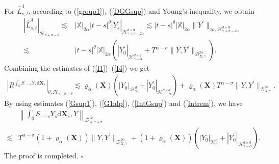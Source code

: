 \documentclass[10pt,a4paper]{article}
\numberwithin{equation}{section}
\begin{document}
For $\hat{L}_{s,t}^4$, according to (\ref{group1}), (\ref{DGGsup}) and Young's inequality, we obtain
\begin{align}\label{I4}
	|\hat{L}_{s,t}^4|_{\mathcal H_{\gamma+\sigma-\theta}} \lesssim & |\mathbb{X}|_{2\alpha} |t-s|^\theta |Y_s^\prime|_{\mathcal H_{\gamma+\sigma-2\alpha}^{d \times d}}
	\lesssim |t-s|^\theta |\mathbb{X}|_{2\alpha} \|Y^\prime \|_{\infty,\mathcal H_{\gamma+\sigma-2\alpha}^{d \times d}} \nonumber\\
	\lesssim & |t-s|^\theta |\mathbb{X}|_{2\alpha} \left(|Y_0^\prime|_{\mathcal H_{\gamma-\alpha}^{d \times d}}+T^{\alpha-\sigma}\|Y,Y^\prime\|_{\mathcal{D}_{X,\gamma}^{2\alpha}} \right).
\end{align}
Combining the estimates of (\ref{I1})--(\ref{I4}) we get
\begin{align}\label{Intrem}
	\left|R^{\int_0^\cdot S_{\cdot-s} Y_s \mathrm{d} \mathbf X_s} \right|_{\theta,\mathcal H_{\gamma+\sigma-\theta}}
	\lesssim \varrho_{\alpha}(\mathbf{X}) \left(|Y_0|_{\mathcal H_\gamma^d}+|Y_0^\prime|_{\mathcal H_{\gamma-\alpha}^{d \times d}} \right)
	+ \varrho_{\alpha}(\mathbf{X}) T^{\alpha-\sigma} \|Y,Y^\prime\|_{\mathcal{D}_{X,\gamma}^{2\alpha}}.
\end{align}
By using estimates (\ref{Gsup1}), (\ref{G1alp}), (\ref{IntGsup}) and (\ref{Intrem}),
we have
\begin{align}\label{BInt}
	&\left\|\int_0^\cdot S_{\cdot-s} Y_s \mathrm{d} \mathbf X_s, Y \right\|_{\mathcal{D}_{X,\gamma+\sigma}^{2\alpha}} \nonumber\\
	\lesssim & T^{\alpha-\sigma} \left(1+\varrho_{\alpha}(\mathbf{X}) \right) \|Y,Y^\prime\|_{\mathcal{D}_{X,\gamma}^{2\alpha}} +(1+\varrho_{\alpha}(\mathbf{X})) \left(|Y_0|_{\mathcal H_\gamma^d}+|Y_0^\prime|_{\mathcal H_{\gamma-\alpha}^{d \times d}} \right).
\end{align}
The proof is completed. 	 \hfill $\square$		
	
	
\end{document}
